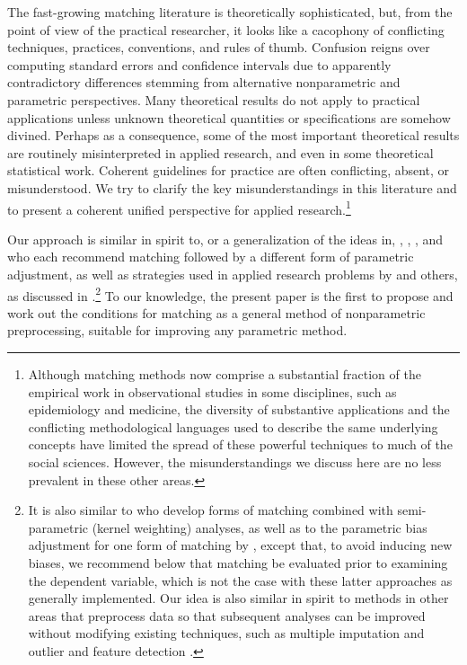 \documentclass[11pt,titlepage]{article}
\begin{document}
The fast-growing matching literature is theoretically sophisticated,
but, from the point of view of the practical researcher, it looks like
a cacophony of conflicting techniques, practices, conventions, and
rules of thumb.  Confusion reigns over computing standard errors and
confidence intervals due to apparently contradictory differences
stemming from alternative nonparametric and parametric perspectives.
Many theoretical results do not apply to practical applications unless
unknown theoretical quantities or specifications are somehow divined.
Perhaps as a consequence, some of the most important theoretical
results are routinely misinterpreted in applied research, and even in
some theoretical statistical work.  Coherent guidelines for practice
are often conflicting, absent, or misunderstood.  We try to clarify
the key misunderstandings in this literature and to present a coherent
unified perspective for applied research.\footnote{Although matching
  methods now comprise a substantial fraction of the empirical work in
  observational studies in some disciplines, such as epidemiology and
  medicine, the diversity of substantive applications and the
  conflicting methodological languages used to describe the same
  underlying concepts have limited the spread of these powerful
  techniques to much of the social sciences.  However, the
  misunderstandings we discuss here are no less prevalent in these
  other areas.}

Our approach is similar in spirit to, or a generalization of the ideas
in, \citet{CocRub73}, \citet{RosRub84a}, \citet{Rubin73b,Rubin79}, and
\citet{RubTho00} who each recommend matching followed by a different
form of parametric adjustment, as well as strategies used in applied
research problems by \citet{Rosenbaum86} and others, as discussed in
\citet{GlaLevMye03}.\footnote{It is also similar to
  \citet{HecIchTod98} who develop forms of matching combined with
  semi-parametric (kernel weighting) analyses, as well as to the
  parametric bias adjustment for one form of matching by
  \citet{AbaImb06}, except that, to avoid inducing new biases, we
  recommend below that matching be evaluated prior to examining the
  dependent variable, which is not the case with these latter
  approaches as generally implemented.  Our idea is also similar in
  spirit to methods in other areas that preprocess data so that
  subsequent analyses can be improved without modifying existing
  techniques, such as multiple imputation \citep{Rubin87,KinHonJos01}
  and outlier and feature detection \citep[][Ch.8]{Bishop95}.}  To our
knowledge, the present paper is the first to propose and work out the
conditions for matching as a general method of nonparametric
preprocessing, suitable for improving any parametric method.  
\end{document}
